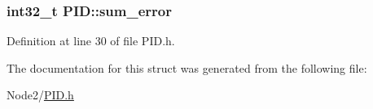 \subsubsection[{\texorpdfstring{sum\+\_\+error}{sum_error}}]{\setlength{\rightskip}{0pt plus 5cm}int32\+\_\+t P\+I\+D\+::sum\+\_\+error}\hypertarget{struct_p_i_d_aa78b06ddfb1b124f415a0ea84e831935}{}\label{struct_p_i_d_aa78b06ddfb1b124f415a0ea84e831935}


Definition at line 30 of file P\+I\+D.\+h.



The documentation for this struct was generated from the following file\+:\begin{DoxyCompactItemize}
\item 
Node2/\hyperlink{_p_i_d_8h}{P\+I\+D.\+h}\end{DoxyCompactItemize}
